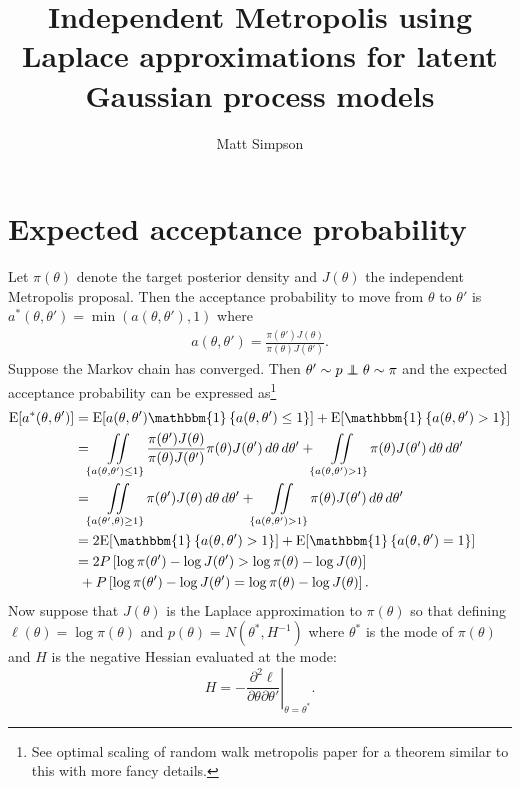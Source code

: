 \documentclass{article}
\author{Matt Simpson}
\title{Independent Metropolis using Laplace approximations for latent Gaussian process models}
\newcommand\independent{\protect\mathpalette{\protect\independenT}{\perp}}
\def\independenT#1#2{\mathrel{\rlap{$#1#2$}\mkern2mu{#1#2}}}
\newcommand\E{\mathrm{E}}
\begin{document}
\maketitle

\section{Expected acceptance probability}
Let $\pi(\theta)$ denote the target posterior density and $J(\theta)$ the independent Metropolis proposal. Then the acceptance probability to move from $\theta$ to $\theta'$ is $a^*(\theta,\theta') = \min(a(\theta,\theta'),1)$ where
\begin{align*}
a(\theta,\theta') = \frac{\pi(\theta') J(\theta)}{\pi(\theta) J(\theta')}.
\end{align*}
Suppose the Markov chain has converged. Then $\theta'\sim p \independent \theta \sim \pi$ and the expected acceptance probability can be expressed as\footnote{See optimal scaling of random walk metropolis paper for a theorem similar to this with more fancy details.}
\begin{align*}
\E[a^*(\theta,\theta')] &= \E[a(\theta,\theta')\mathbbm{1}\left\{a(\theta,\theta') \leq 1\right\}] + \E[\mathbbm{1}\left\{a(\theta,\theta') > 1\right\}]\\
&= \iint\limits_{\left\{a(\theta,\theta')\leq 1\right\}} \frac{\pi(\theta') J(\theta)}{\pi(\theta) J(\theta')} \pi(\theta) J(\theta') \,d\theta\,d\theta' + \iint\limits_{\left\{a(\theta,\theta')> 1\right\}} \pi(\theta) J(\theta') \,d\theta\,d\theta'\\
&= \iint\limits_{\left\{a(\theta',\theta)\geq 1\right\}} \pi(\theta') J(\theta) \,d\theta\,d\theta' + \iint\limits_{\left\{a(\theta,\theta')> 1\right\}} \pi(\theta) J(\theta') \,d\theta\,d\theta'\\
&= 2\E[\mathbbm{1}\left\{a(\theta,\theta') > 1\right\}] + \E[\mathbbm{1}\left\{a(\theta,\theta') = 1\right\}]\\
&= 2P\left[\log\pi(\theta')- \log J(\theta')>\log\pi(\theta) - \log J(\theta)\right] \\
&\ + P\left[\log\pi(\theta')- \log J(\theta') = \log\pi(\theta) - \log J(\theta)\right].
\end{align*}
Now suppose that $J(\theta)$ is the Laplace approximation to $\pi(\theta)$ so that defining $\ell(\theta) = \log\pi(\theta)$ and $p(\theta)=N(\theta^*,H^{-1})$ where $\theta^*$ is the mode of $\pi(\theta)$ and $H$ is the negative Hessian evaluated at the mode:
\[
H = - \left.\frac{\partial^2 \ell}{\partial \theta\partial \theta'}\right|_{\theta = \theta^*}.
\]
\end{document}
